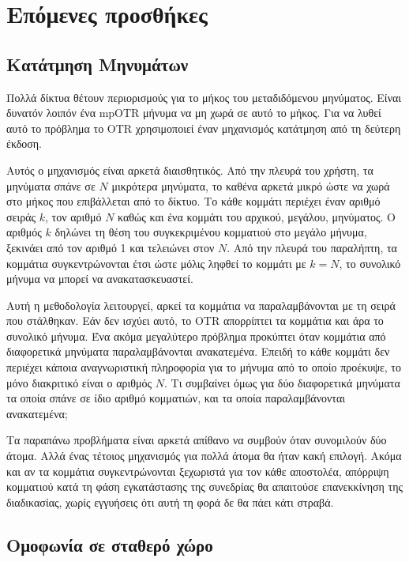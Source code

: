 \section{Επόμενες προσθήκες}

\subsection{Κατάτμηση Μηνυμάτων}
Πολλά δίκτυα θέτουν περιορισμούς για το μήκος του μεταδιδόμενου μηνύματος.
Είναι δυνατόν λοιπόν ένα mpOTR μήνυμα να μη χωρά σε αυτό το μήκος.
Για να λυθεί αυτό το πρόβλημα το OTR χρησιμοποιεί έναν μηχανισμός κατάτμηση από τη δεύτερη έκδοση.

Αυτός ο μηχανισμός είναι αρκετά διαισθητικός.
Από την πλευρά του χρήστη, τα μηνύματα σπάνε σε $Ν$ μικρότερα μηνύματα, το καθένα αρκετά μικρό ώστε να χωρά στο μήκος που επιβάλλεται από το δίκτυο.
Το κάθε κομμάτι περιέχει έναν αριθμό σειράς $k$, τον αριθμό $Ν$ καθώς και ένα κομμάτι του αρχικού, μεγάλου, μηνύματος.
Ο αριθμός $k$ δηλώνει τη θέση του συγκεκριμένου κομματιού στο μεγάλο μήνυμα, ξεκινάει από τον αριθμό 1 και τελειώνει στον $Ν$.
Από την πλευρά του παραλήπτη, τα κομμάτια συγκεντρώνονται έτσι ώστε μόλις ληφθεί το κομμάτι με $k = Ν$, το συνολικό μήνυμα να μπορεί να ανακατασκευαστεί.

Αυτή η μεθοδολογία λειτουργεί, αρκεί τα κομμάτια να παραλαμβάνονται με τη σειρά που στάλθηκαν.
Εάν δεν ισχύει αυτό, το OTR απορρίπτει τα κομμάτια και άρα το συνολικό μήνυμα.
Ένα ακόμα μεγαλύτερο πρόβλημα προκύπτει όταν κομμάτια από διαφορετικά μηνύματα παραλαμβάνονται ανακατεμένα.
Επειδή το κάθε κομμάτι δεν περιέχει κάποια αναγνωριστική πληροφορία για το μήνυμα από το οποίο προέκυψε, το μόνο διακριτικό είναι ο αριθμός $Ν$.
Τι συμβαίνει όμως για δύο διαφορετικά μηνύματα τα οποία σπάνε σε ίδιο αριθμό κομματιών, και τα οποία παραλαμβάνονται ανακατεμένα;

Τα παραπάνω προβλήματα είναι αρκετά απίθανο να συμβούν όταν συνομιλούν δύο άτομα.
Αλλά ένας τέτοιος μηχανισμός για πολλά άτομα θα ήταν κακή επιλογή.
Ακόμα και αν τα κομμάτια συγκεντρώνονται ξεχωριστά για τον κάθε αποστολέα, απόρριψη κομματιού κατά τη φάση εγκατάστασης της συνεδρίας θα απαιτούσε επανεκκίνηση της διαδικασίας, χωρίς εγγυήσεις ότι αυτή τη φορά δε θα πάει κάτι στραβά.

\subsection{Ομοφωνία σε σταθερό χώρο}

